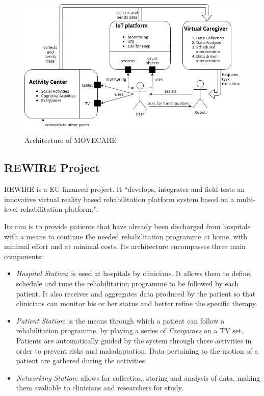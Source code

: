 \documentclass[12pt,a4paper,oneside]{report}
\begin{document}
\begin{figure}[H]
\begin{center}
\includegraphics[width=13cm]{giraffmovecare}
\caption{Architecture of MOVECARE \cite{movecareimage}}
 \label{fig:movecare}
 \end{center}
\end{figure}

\pagebreak

\subsection{REWIRE Project}
REWIRE \cite{rewire} is a EU-financed project. It ``develops, integrates and field tests an innovative virtual reality based rehabilitation platform system based on a multi-level rehabilitation platform.".

Its aim is to provide patients that have already been discharged from hospitals with a means to continue the needed rehabilitation programme at home, with minimal effort and at minimal costs. Its architecture encompasses three main components:

\begin{itemize}\setlength{\itemsep}{8pt}
\item \textit{Hospital Station}: is used at hospitals by clinicians. It allows them to define, schedule and tune the rehabilitation programme to be followed by each patient. It also receives and aggregates data produced by the patient so that clinicians can monitor his or her status and better refine the specific therapy.
\item \textit{Patient Station}: is the means through which a patient can follow a rehabilitation programme, by playing a series of \textit{Exergames} on a TV set. Patients are automatically guided by the system through these activities in order to prevent risks and maladaptation. Data pertaining to the motion of a patient are gathered during the activities.
\item \textit{Networking Station}: allows for collection, storing and analysis of data, making them avaliable to clinicians and researchers for study.
\end{itemize}
\end{document}
